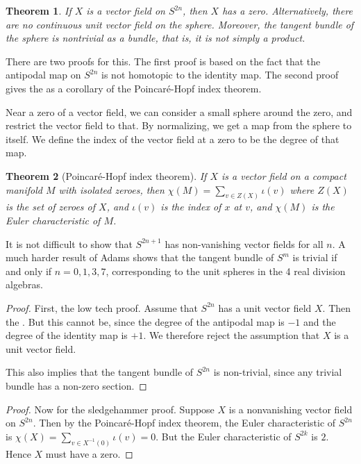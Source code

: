 \documentclass[12pt]{article}
\newtheorem*{theorem*}{Theorem}
\begin{document}
\begin{theorem*}
If $X$ is a vector field on $S^{2n}$, then $X$ has a zero.
Alternatively, there are no continuous unit vector field on
the sphere.  Moreover, the tangent bundle of the sphere is
nontrivial as a bundle, that is, it is not simply a product.
\end{theorem*}

There are two proofs for this.  The first proof is based
on the fact that the antipodal map on $S^{2n}$ is not homotopic to the 
identity map.  The second proof gives the 
as a corollary of the Poincar\'e-Hopf index theorem.

Near a zero of a vector field, we can consider a small sphere around the zero, and restrict the vector field to that. By normalizing, we get a map from the sphere to itself. We define the index of the vector field at a zero to be the degree of that map.

\begin{theorem*}[Poincar\'e-Hopf index theorem]
If $X$ is a vector field on a compact manifold $M$ with 
isolated zeroes, then $\chi(M)=\sum_{v\in Z(X)}\iota(v)$ 
where $Z(X)$ is the set of zeroes of $X$, and $\iota(v)$ is 
the index of $x$ at $v$, and $\chi(M)$ is the Euler characteristic of $M$.
\end{theorem*}

It is not difficult to show that $S^{2n+1}$ has non-vanishing vector 
fields for all $n$.  A much harder result of Adams shows that the 
tangent bundle of $S^m$ is trivial if and only if $n=0,1,3,7$, 
corresponding to the unit spheres in the 4 real division algebras.

\begin{proof}
First, the low tech proof.  Assume that $S^{2n}$ has a unit vector field
$X$.  Then the .  
But this cannot be, since the degree of the antipodal map is $-1$ and
the degree of the identity map is $+1$.  We therefore reject the
assumption that $X$ is a unit vector field.

This also implies that the tangent bundle of $S^{2n}$ is non-trivial, 
since any trivial bundle has a non-zero section.
\end{proof}

\begin{proof}
Now for the sledgehammer proof.
Suppose $X$ is a nonvanishing vector field on $S^{2n}$.  
Then by the Poincar\'e-Hopf index theorem, the Euler characteristic 
of $S^{2n}$ is $\chi(X)=\sum_{v\in X^{-1}(0)}\iota(v)=0$.  But the Euler characteristic of $S^{2k}$ is $2$.  Hence $X$ must have a zero.
\end{proof}
\end{document}
